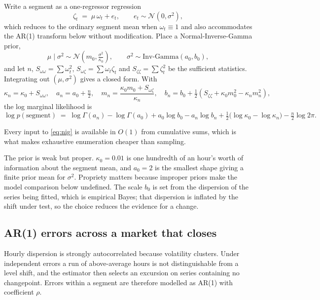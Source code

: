 \documentclass[11pt,a4paper]{article}
\begin{document}
Write a segment as a one-regressor regression
\[
\zeta_t \;=\; \mu \, \omega_t + e_t, \qquad e_t \sim \mathcal{N}(0, \sigma^2),
\]
which reduces to the ordinary segment mean when $\omega_t \equiv 1$ and also accommodates
the AR(1) transform below without modification. Place a Normal-Inverse-Gamma prior,
\[
\mu \mid \sigma^2 \sim \mathcal{N}\!\left(m_0, \tfrac{\sigma^2}{\kappa_0}\right),
\qquad
\sigma^2 \sim \mathrm{Inv\text{-}Gamma}(a_0, b_0),
\]
and let $n$, $S_{\omega\omega} = \sum \omega_t^2$, $S_{\omega\zeta} = \sum \omega_t \zeta_t$
and $S_{\zeta\zeta} = \sum \zeta_t^2$ be the sufficient statistics. Integrating out
$(\mu,\sigma^2)$ gives a closed form. With
\[
\kappa_n = \kappa_0 + S_{\omega\omega}, \quad
a_n = a_0 + \tfrac{n}{2}, \quad
m_n = \frac{\kappa_0 m_0 + S_{\omega\zeta}}{\kappa_n}, \quad
b_n = b_0 + \tfrac{1}{2}\!\left(S_{\zeta\zeta} + \kappa_0 m_0^2 - \kappa_n m_n^2\right),
\]
the log marginal likelihood is
\begin{equation}
\log p(\text{segment}) \;=\;
\log\Gamma(a_n) - \log\Gamma(a_0)
+ a_0 \log b_0 - a_n \log b_n
+ \tfrac{1}{2}\bigl(\log \kappa_0 - \log \kappa_n\bigr)
- \tfrac{n}{2}\log 2\pi .
\label{eq:nig}
\end{equation}

Every input to \eqref{eq:nig} is available in $O(1)$ from cumulative sums, which is what
makes exhaustive enumeration cheaper than sampling.

The prior is weak but proper. $\kappa_0 = 0.01$ is one hundredth of an hour's worth of
information about the segment mean, and $a_0 = 2$ is the smallest shape giving a finite
prior mean for $\sigma^2$. Propriety matters because improper priors make the model
comparison below undefined. The scale $b_0$ is set from the dispersion of the series being
fitted, which is empirical Bayes; that dispersion is inflated by the shift under test, so
the choice reduces the evidence for a change.

\subsection{AR(1) errors across a market that closes}

Hourly dispersion is strongly autocorrelated because volatility clusters. Under independent
errors a run of above-average hours is not distinguishable from a level shift, and the
estimator then selects an excursion on series containing no changepoint. Errors within a
segment are therefore modelled as AR(1) with coefficient $\rho$.
\end{document}
